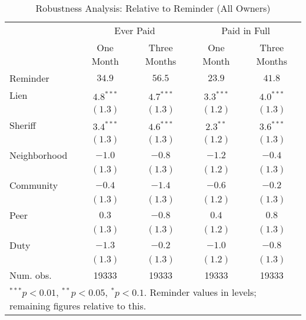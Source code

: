 \documentclass[12pt]{article}
\begin{document}
\begin{appendix}
\begin{table}[htbp]
\caption{Robustness Analysis: Relative to Reminder (All Owners)}\label{sh_lpm_mult}
\begin{center}
\begin{tabular}{l c c c c }
\hline
 & \multicolumn{2}{c}{Ever Paid} & \multicolumn{2}{c}{Paid in Full} \\
 & One Month & Three Months & One Month & Three Months \\
Reminder     & $34.9$ & $56.5$ & $23.9$ & $41.8$ \\
\hline
Lien         & $4.8^{***}$  & $4.7^{***}$  & $3.3^{***}$  & $4.0^{***}$  \\
             & $(1.3)$      & $(1.3)$      & $(1.2)$      & $(1.3)$      \\
Sheriff      & $3.4^{***}$  & $4.6^{***}$  & $2.3^{**}$   & $3.6^{***}$  \\
             & $(1.3)$      & $(1.3)$      & $(1.2)$      & $(1.3)$      \\
Neighborhood & $-1.0$       & $-0.8$       & $-1.2$       & $-0.4$       \\
             & $(1.3)$      & $(1.3)$      & $(1.2)$      & $(1.3)$      \\
Community    & $-0.4$       & $-1.4$       & $-0.6$       & $-0.2$       \\
             & $(1.3)$      & $(1.3)$      & $(1.2)$      & $(1.3)$      \\
Peer         & $0.3$        & $-0.8$       & $0.4$        & $0.8$        \\
             & $(1.3)$      & $(1.3)$      & $(1.2)$      & $(1.3)$      \\
Duty         & $-1.3$       & $-0.2$       & $-1.0$       & $-0.8$       \\
             & $(1.3)$      & $(1.3)$      & $(1.2)$      & $(1.3)$      \\
\hline
Num. obs.    & 19333        & 19333        & 19333        & 19333        \\
\hline
\multicolumn{5}{l}{\scriptsize{$^{***}p<0.01$, $^{**}p<0.05$, $^*p<0.1$. Reminder values in levels; remaining figures relative to this.}}
\end{tabular}
\end{center}
\end{table}


\end{appendix}
\end{document}
